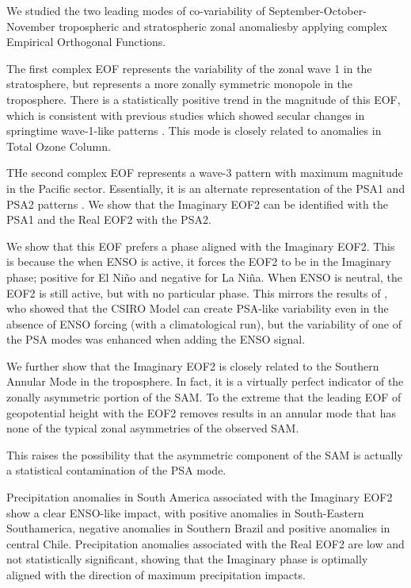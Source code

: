 \documentclass[smallextended]{svjour3}       %
\begin{document}
We studied the two leading modes of co-variability of September-October-November tropospheric and stratospheric zonal anomaliesby applying complex Empirical Orthogonal Functions.

The first complex EOF represents the variability of the zonal wave 1 in the stratosphere, but represents a more zonally symmetric monopole in the troposphere. There is a statistically positive trend in the magnitude of this EOF, which is consistent with previous studies which showed secular changes in springtime wave-1-like patterns \citep[e.g.][]{raphael2003}. This mode is closely related to anomalies in Total Ozone Column.

THe second complex EOF represents a wave-3 pattern with maximum magnitude in the Pacific sector. Essentially, it is an alternate representation of the PSA1 and PSA2 patterns \citep{mo2001}. We show that the Imaginary EOF2 can be identified with the PSA1 and the Real EOF2 with the PSA2.

We show that this EOF prefers a phase aligned with the Imaginary EOF2. This is because the when ENSO is active, it forces the EOF2 to be in the Imaginary phase; positive for El Niño and negative for La Niña. When ENSO is neutral, the EOF2 is still active, but with no particular phase. This mirrors the results of \citet{cai2002}, who showed that the CSIRO Model can create PSA-like variability even in the absence of ENSO forcing (with a climatological run), but the variability of one of the PSA modes was enhanced when adding the ENSO signal.

We further show that the Imaginary EOF2 is closely related to the Southern Annular Mode in the troposphere. In fact, it is a virtually perfect indicator of the zonally asymmetric portion of the SAM. To the extreme that the leading EOF of geopotential height with the EOF2 removes results in an annular mode that has none of the typical zonal asymmetries of the observed SAM.

This raises the possibility that the asymmetric component of the SAM is actually a statistical contamination of the PSA mode.

Precipitation anomalies in South America associated with the Imaginary EOF2 show a clear ENSO-like impact, with positive anomalies in South-Eastern Southamerica, negative anomalies in Southern Brazil and positive anomalies in central Chile. Precipitation anomalies associated with the Real EOF2 are low and not statistically significant, showing that the Imaginary phase is optimally aligned with the direction of maximum precipitation impacts.
\end{document}
